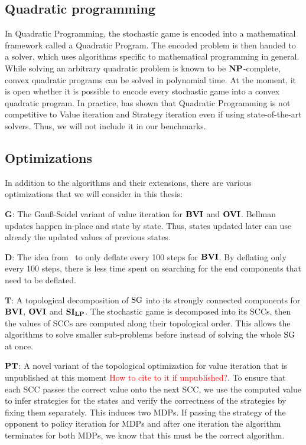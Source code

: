 \subsection{Quadratic programming}
In Quadratic Programming, the stochastic game is encoded into a mathematical framework called a Quadratic Program. 
The encoded problem is then handed to a solver, which uses algorithms specific to mathematical programming in general.
While solving an arbitrary quadratic problem is known to be $\mathbf{NP}$-complete, convex quadratic programs can be solved in polynomial time.
At the moment, it is open whether it is possible to encode every stochastic game into a convex quadratic program.
In practice, \cite{gandalf} has shown that Quadratic Programming is not competitive to Value iteration and Strategy iteration even if using 
state-of-the-art solvers. Thus, we will not include it in our benchmarks.

\subsection{Optimizations} \label{subsec:optimizations}
In addition to the algorithms and their extensions, there are various optimizations that we will consider in this thesis:

$\mathbf{G}$: The Gau{\ss}-Seidel variant of value iteration for $\mathbf{BVI}$ and $\mathbf{OVI}$. 
Bellman updates happen in-place and state by state. Thus, states updated later can use already the updated values of previous states. 

$\mathbf{D}$: The idea from~\cite{paperMaxi} to only deflate every 100 steps for $\mathbf{BVI}$. 
By deflating only every 100 steps, there is less time spent on searching for the end components that need to be deflated.

$\mathbf{T}$: A topological decomposition of $\textrm{SG}$ into its strongly connected components for $\mathbf{BVI}$, $\mathbf{OVI}$ and $\mathbf{SI_{LP}}$.
The stochastic game is decomposed into its SCCs, then the values of SCCs are computed along their topological order.
This allows the algorithms to solve smaller sub-problems before instead of solving the whole $\textrm{SG}$ at once.

$\mathbf{PT}$: A novel variant of the topological optimization for value iteration that is unpublished at this moment \textcolor{red}{How to cite to it if unpublished?}.
To ensure that each SCC passes the correct value onto the next SCC, we use the computed value to infer strategies for the states and 
verify the correctness of the strategies by fixing them separately. This induces two MDPs. 
If passing the strategy of the opponent to policy iteration for MDPs and after one iteration the algorithm terminates for both MDPs,
we know that this must be the correct algorithm.

